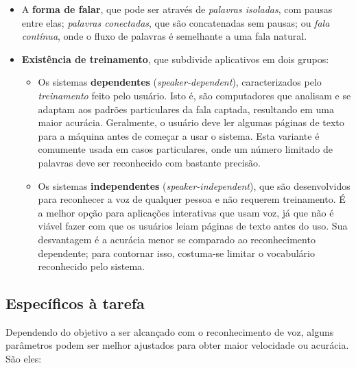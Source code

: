\begin{itemize}
\item A \textbf{forma de falar}, que pode ser através de \emph{palavras isoladas}, com pausas entre elas; \emph{palavras conectadas}, que são concatenadas sem pausas; ou \emph{fala contínua}, onde o fluxo de palavras é semelhante a uma fala natural.

\item \textbf{Existência de treinamento}, que subdivide aplicativos em dois grupos:

\begin{itemize}[label=\scriptsize$\bullet$]
\item Os sistemas \textbf{dependentes} (\textit{speaker-dependent}), caracterizados pelo \emph{treinamento} feito pelo usuário. Isto é, são computadores que analisam e se adaptam aos padrões particulares da fala captada, resultando em uma maior acurácia. Geralmente, o usuário deve ler algumas páginas de texto para a máquina antes de começar a usar o sistema. Esta variante é comumente usada em casos particulares, onde um número limitado de palavras deve ser reconhecido com bastante precisão.

\item Os sistemas \textbf{independentes} (\textit{speaker-independent}), que são desenvolvidos para reconhecer a voz de qualquer pessoa e não requerem treinamento. É a melhor opção para aplicações interativas que usam voz, já que não é viável fazer com que os usuários leiam páginas de texto antes do uso. Sua desvantagem é a acurácia menor se comparado ao reconhecimento dependente; para contornar isso, costuma-se limitar o vocabulário reconhecido pelo sistema.
\end{itemize}

\end{itemize}


\subsection{Específicos à tarefa}

Dependendo do objetivo a ser alcançado com o reconhecimento de voz, alguns parâmetros podem ser melhor ajustados para obter maior velocidade ou acurácia. São eles:

